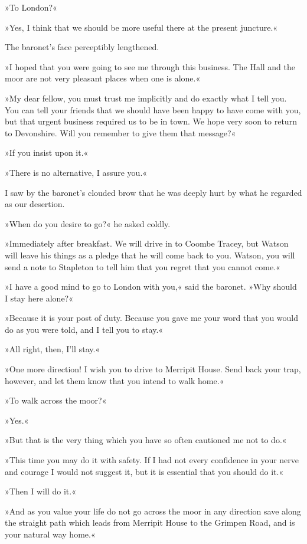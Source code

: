 »To London?«

»Yes, I think that we should be more useful there at the present juncture.«

The baronet's face perceptibly lengthened.

»I hoped that you were going to see me through this business. The Hall and the moor are not very pleasant places when one is alone.«

»My dear fellow, you must trust me implicitly and do exactly what I tell you. You can tell your friends that we should have been happy to have come with you, but that urgent business required us to be in town. We hope very soon to return to Devonshire. Will you remember to give them that message?«

»If you insist upon it.«

»There is no alternative, I assure you.«

I saw by the baronet's clouded brow that he was deeply hurt by what he regarded as our desertion.

»When do you desire to go?« he asked coldly.

»Immediately after breakfast. We will drive in to Coombe \newline Tracey, but Watson will leave his things as a pledge that he will come back to you. Watson, you will send a note to Stapleton to tell him that you regret that you cannot come.«

»I have a good mind to go to London with you,« said the baronet. »Why should I stay here alone?«

»Because it is your post of duty. Because you gave me your word that you would do as you were told, and I tell you to stay.«

»All right, then, I'll stay.«

»One more direction! I wish you to drive to Merripit House. Send back your trap, however, and let them know that you intend to walk home.«

»To walk across the moor?«

»Yes.«

»But that is the very thing which you have so often cautioned me not to do.«

»This time you may do it with safety. If I had not every confidence in your nerve and courage I would not suggest it, but it is essential that you should do it.«

»Then I will do it.«

»And as you value your life do not go across the moor in any direction save along the straight path which leads from Merripit House to the Grimpen Road, and is your natural way home.«

